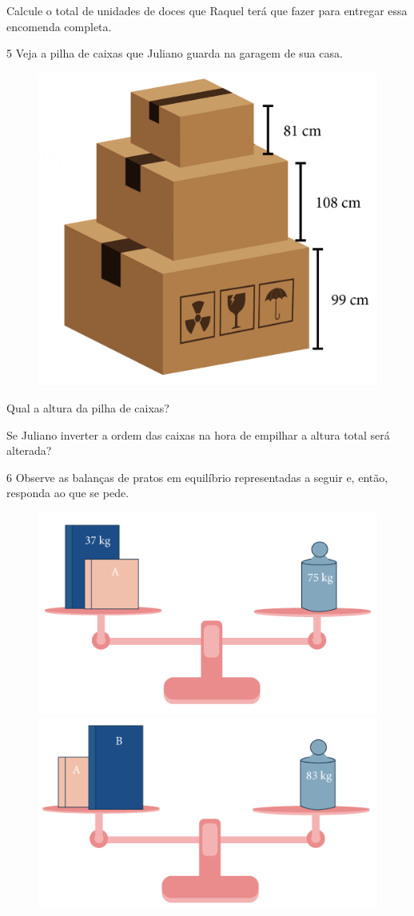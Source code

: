 Calcule o total de unidades de doces que Raquel terá que fazer para entregar essa encomenda completa.


\pagebreak

\num{5} Veja a pilha de caixas que Juliano guarda na garagem de sua casa.

\begin{figure}[htpb!]
\centering
\includegraphics[width=.5\textwidth]{../ilustracoes/MAT5/SAEB_5ANO_MAT_figura19.png}
\end{figure}

\begin{escolha}
\item
  Qual a altura da pilha de caixas?

\bigskip

\item
  Se Juliano inverter a ordem das caixas na hora de empilhar a altura
  total será alterada?

\end{escolha}


\num{6} Observe as balanças de pratos em equilíbrio representadas a seguir e, então, responda ao que se pede.

\begin{figure}[htpb!]
\includegraphics[width=.5\textwidth]{../ilustracoes/MAT5/SAEB_5ANO_MAT_figura20a.png}
\includegraphics[width=.5\textwidth]{../ilustracoes/MAT5/SAEB_5ANO_MAT_figura20b.png}
\end{figure}

